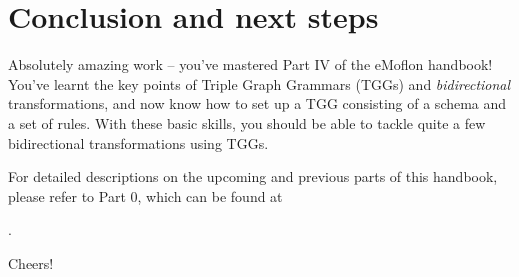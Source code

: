 \section{Conclusion and next steps}
\genHeader

\vspace{0.5cm}

Absolutely amazing work -- you've mastered Part IV of the eMoflon handbook! You've learnt the key points of Triple Graph Grammars (TGGs) and \emph{bidirectional} transformations, and now know how to set up a TGG consisting of a schema and a set of rules. 
With these basic skills, you should be able to tackle quite a few bidirectional transformations using TGGs.

For detailed descriptions on the upcoming and previous parts of this handbook, please refer to Part 0, which can be found at 

\dlPartZero.

Cheers!


